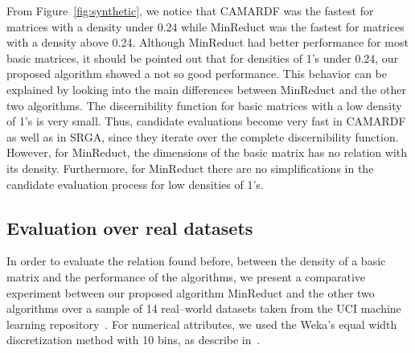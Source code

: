 \documentclass[authoryear,preprint,review,12pt]{elsarticle}
\begin{document}
	From Figure~\ref{fig:synthetic}, we notice that CAMARDF was the fastest for matrices with a density under 0.24 while MinReduct was the fastest for matrices with a density above 0.24. Although MinReduct had better performance for most basic matrices, it should be pointed out that for densities of 1's under 0.24, our proposed algorithm showed a not so good performance. This behavior can be explained by looking into the main differences between MinReduct and the other two algorithms. The discernibility function for basic matrices with a low density of 1's is very small. Thus, candidate evaluations become very fast in CAMARDF as well as in SRGA, since they iterate over the complete discernibility function. However, for MinReduct, the dimensions of the basic matrix has no relation with its density. Furthermore, for MinReduct there are no simplifications in the candidate evaluation process for low densities of 1's. 
	
	
\subsection{Evaluation over real datasets}
	In order to evaluate the relation found before, between the density of a basic matrix and the performance of the algorithms, we present a comparative experiment between our proposed algorithm MinReduct and the other two algorithms over a sample of 14 real--world datasets taken from the UCI machine learning repository~\citep{Bache13}. For numerical attributes, we used the Weka's equal width discretization method with 10 bins, as describe in~\citep{Flores2010}.
\end{document}

